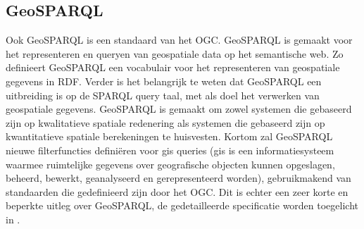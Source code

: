 \subsection{GeoSPARQL}
Ook GeoSPARQL is een standaard van het OGC. GeoSPARQL is gemaakt voor het representeren en queryen van geospatiale data op het semantische web. Zo definieert GeoSPARQL een vocabulair voor het representeren van geospatiale gegevens in RDF. Verder is het belangrijk te weten dat GeoSPARQL een uitbreiding is op de SPARQL query taal, met als doel het verwerken van geospatiale gegevens. GeoSPARQL is gemaakt om zowel systemen die gebaseerd zijn op kwalitatieve spatiale redenering als systemen die gebaseerd zijn op kwantitatieve spatiale berekeningen te huisvesten. Kortom zal GeoSPARQL nieuwe filterfuncties definiëren voor \acrfull{gis} queries (\acrshort{gis} is een informatiesysteem waarmee ruimtelijke gegevens over geografische objecten kunnen opgeslagen, beheerd, bewerkt, geanalyseerd en gerepresenteerd worden), gebruikmakend van standaarden die gedefinieerd zijn door het OGC. Dit is echter een zeer korte en beperkte uitleg over GeoSPARQL, de gedetailleerde specificatie worden toegelicht in .